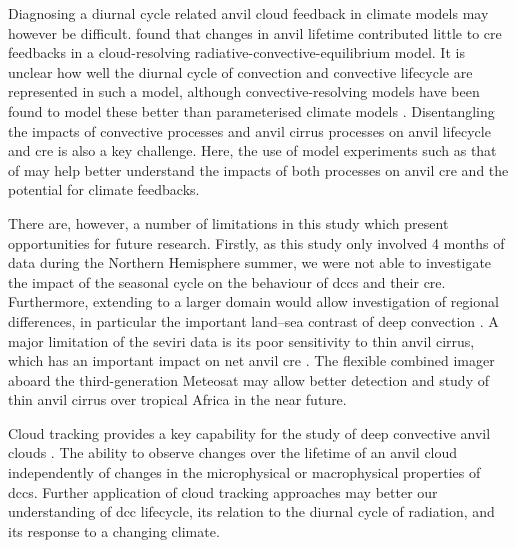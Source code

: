 Diagnosing a diurnal cycle related anvil cloud feedback in climate models may however be difficult.
\citet{beydoun_dissecting_2021} found that changes in anvil lifetime contributed little to \acrshort{cre} feedbacks in a cloud-resolving radiative-convective-equilibrium model.
It is unclear how well the diurnal cycle of convection and convective lifecycle are represented in such a model, although convective-resolving models have been found to model these better than parameterised climate models \citep{prein_review_2015, feng_mesoscale_2023}.
Disentangling the impacts of convective processes and anvil cirrus processes on anvil lifecycle and \acrshort{cre} is also a key challenge.
Here, the use of model experiments such as that of \citet{gasparini_diurnal_2022} may help better understand the impacts of both processes on anvil \acrfull{cre} and the potential for climate feedbacks.

There are, however, a number of limitations in this study which present opportunities for future research. 
Firstly, as this study only involved 4 months of data during the Northern Hemisphere summer, we were not able to investigate the impact of the seasonal cycle on the behaviour of \acrshort{dcc}s and their \acrshort{cre}. 
Furthermore, extending to a larger domain would allow investigation of regional differences, in particular the important land--sea contrast of deep convection \citep{takahashi_revisiting_2023}. 
A major limitation of the \acrshort{seviri} data is its poor sensitivity to thin anvil cirrus, which has an important impact on net anvil \acrshort{cre} \citep{protopapadaki_upper_2017, horner_evolution_2023}.
The flexible combined imager \citep{martin_fci_2021} aboard the third-generation Meteosat may allow better detection and study of thin anvil cirrus over tropical Africa in the near future.

Cloud tracking provides a key capability for the study of deep convective anvil clouds \citep{gasparini_opinion_2023}.
The ability to observe changes over the lifetime of an anvil cloud independently of changes in the microphysical or macrophysical properties of \acrshort{dcc}s.
Further application of cloud tracking approaches may better our understanding of \acrshort{dcc} lifecycle, its relation to the diurnal cycle of radiation, and its response to a changing climate.


